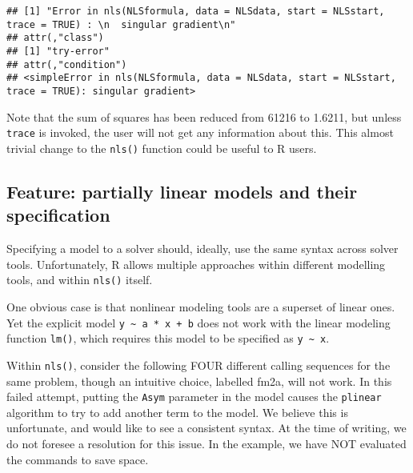 \documentclass[
]{article}
\begin{document}
\begin{verbatim}
## [1] "Error in nls(NLSformula, data = NLSdata, start = NLSstart, trace = TRUE) : \n  singular gradient\n"
## attr(,"class")
## [1] "try-error"
## attr(,"condition")
## <simpleError in nls(NLSformula, data = NLSdata, start = NLSstart, trace = TRUE): singular gradient>
\end{verbatim}

Note that the sum of squares has been reduced from 61216 to 1.6211, but
unless \texttt{trace} is invoked, the user will not get any information
about this. This almost trivial change to the \texttt{nls()} function
could be useful to R users.

\hypertarget{feature-partially-linear-models-and-their-specification}{%
\subsection{Feature: partially linear models and their
specification}\label{feature-partially-linear-models-and-their-specification}}

Specifying a model to a solver should, ideally, use the same syntax
across solver tools. Unfortunately, R allows multiple approaches within
different modelling tools, and within \texttt{nls()} itself.

One obvious case is that nonlinear modeling tools are a superset of
linear ones. Yet the explicit model
\texttt{y\ \textasciitilde{}\ a\ *\ x\ +\ b} does not work with the
linear modeling function \texttt{lm()}, which requires this model to be
specified as \texttt{y\ \textasciitilde{}\ x}.

Within \texttt{nls()}, consider the following FOUR different calling
sequences for the same problem, though an intuitive choice, labelled
fm2a, will not work. In this failed attempt, putting the \texttt{Asym}
parameter in the model causes the \texttt{plinear} algorithm to try to
add another term to the model. We believe this is unfortunate, and would
like to see a consistent syntax. At the time of writing, we do not
foresee a resolution for this issue. In the example, we have NOT
evaluated the commands to save space.
\end{document}
